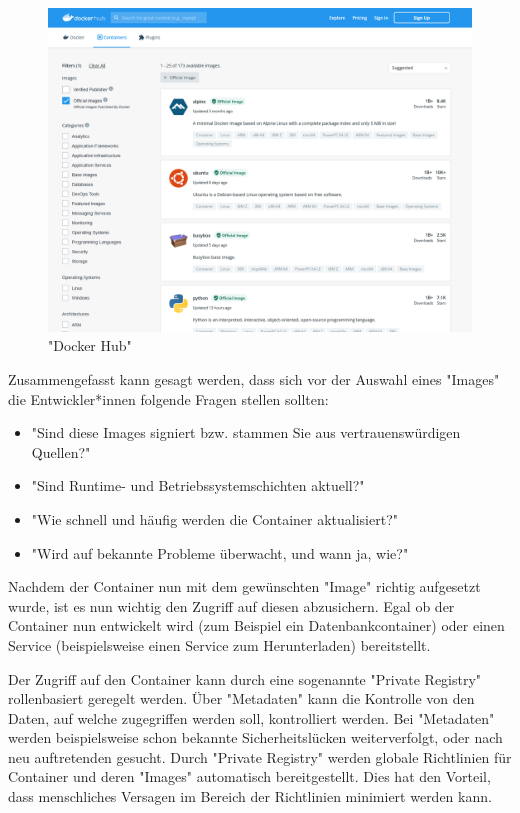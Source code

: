 \begin{figure}[H]
    \centering
    \includegraphics[width=\textwidth]{media/DockerAndContainering/DockerHub.png}
    \caption{"Docker Hub" \cite{DockerHub}}
\end{figure}

Zusammengefasst kann gesagt werden, dass sich vor der Auswahl eines "Images" die Entwickler*innen folgende Fragen stellen sollten:

\begin{itemize}
    \item "Sind diese Images signiert bzw. stammen Sie aus vertrauenswürdigen Quellen?" \cite{ContainerSecurity}
    \item "Sind Runtime- und Betriebssystemschichten aktuell?" \cite{ContainerSecurity}
    \item "Wie schnell und häufig werden die Container aktualisiert?" \cite{ContainerSecurity}
    \item "Wird auf bekannte Probleme überwacht, und wann ja, wie?" \cite{ContainerSecurity}
\end{itemize}


Nachdem der Container nun mit dem gewünschten "Image" richtig aufgesetzt wurde, ist es nun wichtig den Zugriff auf diesen abzusichern. Egal ob der Container nun entwickelt wird (zum Beispiel ein Datenbankcontainer) oder einen Service (beispielsweise einen Service zum Herunterladen) bereitstellt. 

Der Zugriff auf den Container kann durch eine sogenannte "Private Registry" rollenbasiert geregelt werden. Über "Metadaten" kann die Kontrolle von den Daten, auf welche zugegriffen werden soll, kontrolliert werden. Bei "Metadaten" werden beispielsweise schon bekannte Sicherheitslücken weiterverfolgt, oder nach neu auftretenden gesucht. Durch "Private Registry" werden globale Richtlinien für Container und deren "Images" automatisch bereitgestellt. Dies hat den Vorteil, dass menschliches Versagen im Bereich der Richtlinien minimiert werden kann. \cite{ContainerSecurity}

